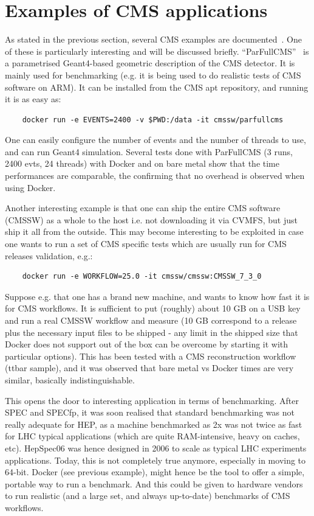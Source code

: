 \documentclass{PoS}
\begin{document}
\section{Examples of CMS applications}

As stated in the previous section, several CMS examples are documented~\cite{DockerGiulio}. One of these is particularly interesting and will be discussed briefly. ``ParFullCMS''~\cite{parfullcms} is a parametrised Geant4-based geometric description of the CMS detector. It is mainly used for benchmarking (e.g. it is being used to do realistic tests of CMS software on ARM). It can be installed from the CMS apt repository, and running it is as easy as:
%
\begin{verbatim}
    docker run -e EVENTS=2400 -v $PWD:/data -it cmssw/parfullcms
\end{verbatim}
%
One can easily configure the number of events and the number of threads to use, and can run Geant4 simulation. Several tests done with ParFullCMS (3 runs, 2400 evts, 24 threads) with Docker and on bare metal show that the time performances are comparable, the confirming that no overhead is observed when using Docker.

Another interesting example is that one can ship the entire CMS software (CMSSW) as a whole to the host i.e. not downloading it via CVMFS, but just ship it all from the outside. This may become interesting to be exploited in case one wants to run a set of CMS specific tests which are usually run for CMS releases validation, e.g.:
%
\begin{verbatim}
    docker run -e WORKFLOW=25.0 -it cmssw/cmssw:CMSSW_7_3_0
\end{verbatim}
%
Suppose e.g. that one has a brand new machine, and wants to know how fast it is for CMS workflows. It is sufficient to put (roughly) about 10 GB on a USB key and run a real CMSSW workflow and measure (10 GB correspond to a release plus the necessary input files to be shipped - any limit in the shipped size that Docker does not support out of the box can be overcome by starting it with particular options). This has been tested with a CMS reconstruction workflow (ttbar sample), and it was observed that bare metal vs Docker
times are very similar, basically indistinguishable.

This opens the door to interesting application in terms of benchmarking. After SPEC and SPECfp, it was soon realised that standard benchmarking was not really adequate for HEP, as a machine benchmarked as 2x was not twice as fast for LHC typical applications (which are quite RAM-intensive, heavy on caches, etc). HepSpec06 was hence designed in 2006 to scale as typical LHC experiments applications. Today, this is not completely true anymore, especially in moving to 64-bit. Docker (see previous example), might hence be the tool to offer a simple, portable way to run a benchmark. And this could be given to hardware vendors to run realistic (and a large set, and always up-to-date) benchmarks of CMS workflows.
\end{document}
